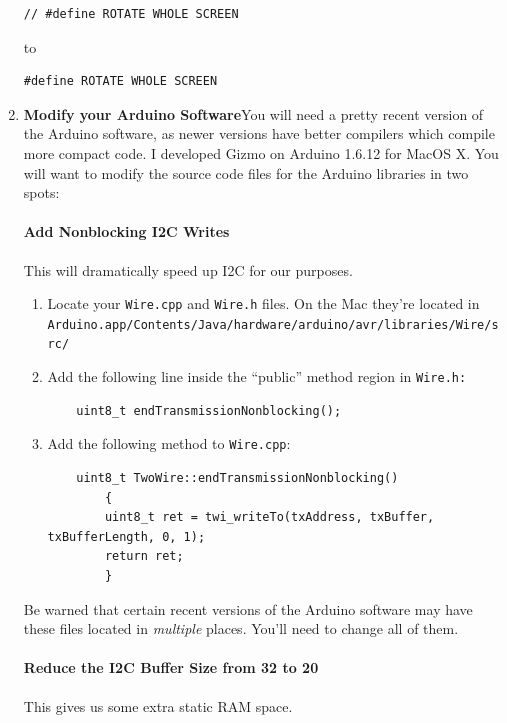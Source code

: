 \documentclass{article}
\begin{document}
\begin{enumerate}
\begin{verbatim}
// #define ROTATE WHOLE SCREEN
\end{verbatim}

to

\begin{verbatim}
#define ROTATE WHOLE SCREEN
\end{verbatim}


\item {\bf Modify your Arduino Software}\quad You will need a pretty recent version of the Arduino software, as newer versions have better compilers which compile more compact code.  I developed Gizmo on Arduino 1.6.12 for MacOS X.  You will want to modify the source code files for the Arduino libraries in two spots:

\paragraph{Add Nonblocking I2C Writes}  This will dramatically speed up I2C for our purposes.
\begin{enumerate}
\item Locate your \texttt{Wire.cpp} and \texttt{Wire.h} files.  On the Mac they're located in\\\texttt{Arduino.app/Contents/Java/hardware/arduino/avr/libraries/Wire/src/}

\item Add the following line inside the ``public'' method region in \texttt{Wire.h:}

\begin{verbatim}
    uint8_t endTransmissionNonblocking();
\end{verbatim}

\item Add the following method to \texttt{Wire.cpp}:

\begin{verbatim}
    uint8_t TwoWire::endTransmissionNonblocking()
        {
        uint8_t ret = twi_writeTo(txAddress, txBuffer, txBufferLength, 0, 1);
        return ret;
        }
\end{verbatim}
\end{enumerate}

Be warned that certain recent versions of the Arduino software may have these files located in {\it multiple} places.  You'll need to change all of them.

\paragraph{Reduce the I2C Buffer Size from 32 to 20} This gives us some extra static RAM space.


\end{enumerate}
\end{document}
